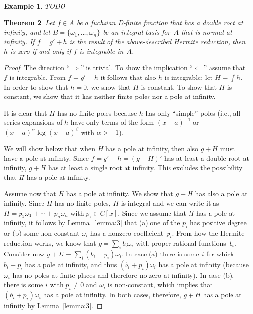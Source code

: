 \documentclass{sig-alternate}
\newtheorem{theorem}{Theorem}
\newtheorem{example}[theorem]{Example}
\begin{document}
\begin{example}
TODO
\end{example}

\begin{theorem}
Let $f\in A$ be a fuchsian D-finite function that has a double root at
infinity, and let $B=\{\omega_1,\ldots,\omega_n\}$ be an integral basis for~$A$
that is normal at infinity.
If $f=g'+h$ is the result of the above-described Hermite reduction,
then $h$ is zero if and only if $f$ is integrable in~$A$.
\end{theorem}
\begin{proof}
The direction ``$\Rightarrow$'' is trivial. To show the implication
``$\Leftarrow$'' assume that $f$ is integrable. From $f=g'+h$ it follows that
also $h$ is integrable; let $H=\int h$.  In order to show that $h=0$, we show
that $H$ is constant.  To show that $H$ is constant, we show that it has
neither finite poles nor a pole at infinity.

It is clear that $H$ has no finite poles because $h$ has only ``simple'' poles
(i.e., all series expansions of $h$ have only terms of the form
$(x-a)^{-1}$ or $(x-a)^\alpha\log(x-a)^\beta$ with $\alpha>-1$).

We will show below that when $H$ has a pole at infinity, then also $g+H$ must
have a pole at infinity.  Since $f=g'+h=(g+H)'$ has at least a double root at
infinity, $g+H$ has at least a single root at infinity. This excludes the
possibility that $H$ has a pole at infinity.

Assume now that $H$ has a pole at infinity. We show that $g+H$ has also a pole at infinity.
Since $H$ has no finite poles, $H$ is integral and we can write it as
$H=p_1\omega_1+\cdots+p_n\omega_n$ with $p_i\in C[x]$.
Since we assume that $H$ has a pole at infinity, it follows by Lemma~\ref{lemma:3} that
(a) one of the $p_i$ has positive degree or
(b) some non-constant $\omega_i$ has a nonzero coefficient~$p_i$.
From how the Hermite reduction works, we know that $g=\sum_i b_i\omega_i$
with proper rational functions~$b_i$. Consider now $g+H=\sum_i (b_i+p_i)\omega_i$.
In case (a) there is some $i$ for which $b_i+p_i$ has a pole at infinity,
and thus $(b_i+p_i)\omega_i$ has a pole at infinity (because $\omega_i$ has
no poles at finite places and therefore no zero at infinity).
In case (b), there is some $i$ with $p_i\neq0$ and $\omega_i$ is non-constant,
which implies that $(b_i+p_i)\omega_i$ has a pole at infinity.
In both cases, therefore, $g+H$ has a pole at infinity by Lemma~\ref{lemma:3}.
\end{proof}
\end{document}
